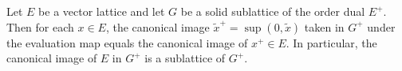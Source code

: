 Let $E$ be a vector lattice and let $G$ be a solid sublattice of the order dual $E^+$. Then for each $x \in E$, the canonical image $\tilde{x}^+ = \sup(0, \tilde{x})$ taken in $G^+$ under the evaluation map equals the canonical image of $x^+ \in E$. In particular, the canonical image of $E$ in $G^+$ is a sublattice of $G^+$.
